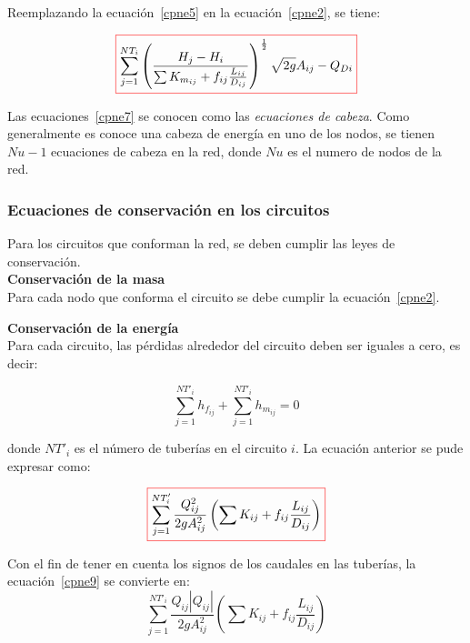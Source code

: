 \documentclass[11pt, oneside]{article}
\begin{document}
Reemplazando la ecuaci\'on~\ref{cpne5} en la ecuaci\'on~\ref{cpne2}, se tiene:

\begin{equation}
\color{red}\boxed{\color{black} \sum_{j=1}^{NT_i} \left(\frac{H_j - H_i }{\sum K_{m_{ij}}  + f_{ij}\frac{L_{ij}}{D_{ij}} } \right)^{\frac{1}{2}} \sqrt{2g} A_{ij} - Q_{Di} }
\label{cpne7}
\end{equation}

Las ecuaciones~\ref{cpne7} se conocen como las \emph{ecuaciones de cabeza}. Como generalmente es conoce una cabeza de energ\'ia en uno de los nodos, se tienen $Nu-1$ ecuaciones de cabeza en la red, donde $Nu$ es el numero de nodos de la red. 

\subsubsection*{Ecuaciones de conservaci\'on en los circuitos}

Para los circuitos que conforman la red, se deben cumplir las leyes de conservaci\'on.\\ 
\textbf{Conservaci\'on de la masa}\\
Para cada nodo que conforma el circuito se debe cumplir la ecuaci\'on~\ref{cpne2}.

\noindent\textbf{Conservaci\'on de la energ\'ia}\\
Para cada circuito, las p\'erdidas alrededor del circuito deben ser iguales a cero, es decir:

\begin{equation}
\sum_{j=1}^{NT'_i} h_{f_{ij}} + \sum_{j=1}^{NT'_i} h_{m_{ij}} =0
\label{cpne8}
\end{equation}

donde $NT'_i$ es el n\'umero de tuber\'ias en el circuito $i$. La ecuaci\'on anterior se pude expresar como:

\begin{equation}
\color{red}\boxed{\color{black} \sum_{j=1}^{NT'_i} \frac{Q_{ij}^2}{2g A_{ij}^2} \left( \sum K_{ij} + f_{ij}\frac{L_{ij}}{D_{ij}} \right)}
\label{cpne9}
\end{equation}

Con el fin de tener en cuenta los signos de los caudales en las tuber\'ias, la ecuaci\'on~\ref{cpne9} se convierte en: 
\begin{equation}
\sum_{j=1}^{NT'_i} \frac{Q_{ij}|Q_{ij}|}{2g A_{ij}^2} \left( \sum K_{ij} + f_{ij}\frac{L_{ij}}{D_{ij}} \right)
\label{cpne10}
\end{equation}
\end{document}
